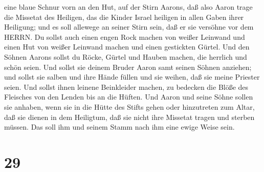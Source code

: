 eine blaue Schnur vorn an den Hut,  auf der Stirn Aarons,
daß also Aaron trage die Missetat des Heiligen, das die Kinder Israel
heiligen in allen Gaben ihrer Heiligung; und es soll allewege an seiner
Stirn sein, daß er sie versöhne vor dem HERRN.  Du sollst
auch einen engen Rock machen von weißer Leinwand und einen Hut von
weißer Leinwand machen und einen gestickten Gürtel.  Und
den Söhnen Aarons sollst du Röcke, Gürtel und Hauben machen, die
herrlich und schön seien.  Und sollst sie deinem Bruder
Aaron samt seinen Söhnen anziehen; und sollst sie salben und ihre Hände
füllen und sie weihen, daß sie meine Priester seien.  Und
sollst ihnen leinene Beinkleider machen, zu bedecken die Blöße des
Fleisches von den Lenden bis an die Hüften.  Und Aaron und
seine Söhne sollen sie anhaben, wenn sie in die Hütte des Stifts gehen
oder hinzutreten zum Altar, daß sie dienen in dem Heiligtum, daß sie
nicht ihre Missetat tragen und sterben müssen. Das soll ihm und seinem
Stamm nach ihm eine ewige Weise sein.

\hypertarget{section-28}{%
\section{29}\label{section-28}}

